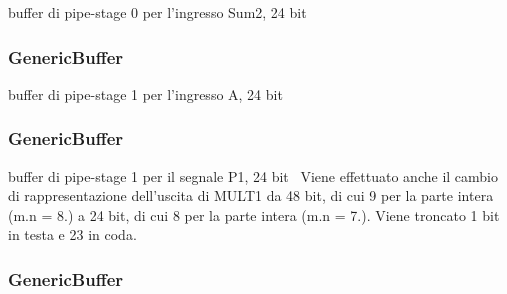 buffer di pipe-\/stage 0 per l'ingresso Sum2, 24 bit 

\hypertarget{class_linear_regression_1_1_structural_a273de05d7892fd1febb31d1c6fab5120}{
\subsubsection[{pipestage1\+\_\+buff\+\_\+a}]{ {\bfseries \textcolor{vhdlchar}{Generic\+Buffer}\textcolor{vhdlchar}{ }} \hspace{0.3cm}{\ttfamily [Instantiation]}}}\label{class_linear_regression_1_1_structural_a273de05d7892fd1febb31d1c6fab5120}


buffer di pipe-\/stage 1 per l'ingresso A, 24 bit~\newline
 

\hypertarget{class_linear_regression_1_1_structural_aa4ecb297c24eee090576a63597934c3c}{
\subsubsection[{pipestage1\+\_\+buff\+\_\+p1}]{ {\bfseries \textcolor{vhdlchar}{Generic\+Buffer}\textcolor{vhdlchar}{ }} \hspace{0.3cm}{\ttfamily [Instantiation]}}}\label{class_linear_regression_1_1_structural_aa4ecb297c24eee090576a63597934c3c}


buffer di pipe-\/stage 1 per il segnale P1, 24 bit~\newline
 Viene effettuato anche il cambio di rappresentazione dell'uscita di M\+U\+L\+T1 da 48 bit, di cui 9 per la parte intera (m.\+n = 8.) a 24 bit, di cui 8 per la parte intera (m.\+n = 7.). Viene troncato 1 bit in testa e 23 in coda. 

\hypertarget{class_linear_regression_1_1_structural_a9cb3bc10f620d667a657ecca4aa0b59a}{
\subsubsection[{pipestage1\+\_\+buff\+\_\+p2}]{ {\bfseries \textcolor{vhdlchar}{Generic\+Buffer}\textcolor{vhdlchar}{ }} \hspace{0.3cm}{\ttfamily [Instantiation]}}}\label{class_linear_regression_1_1_structural_a9cb3bc10f620d667a657ecca4aa0b59a}


